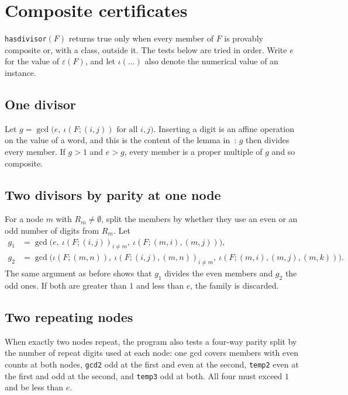 \documentclass[11pt]{article}
\theoremstyle{definition}
\theoremstyle{remark}
\newcommand{\code}[1]{\texttt{#1}}
\begin{document}
\section{Composite certificates}\label{sec:divisor}

\code{hasdivisor}$(F)$ returns true only when every member of $F$ is provably composite or, with a class, outside it. The tests below are tried in order. Write $e$ for the value of $\varepsilon(F)$, and let $\iota(\dots)$ also denote the numerical value of an instance.

\subsection{One divisor}
Let $g=\gcd\bigl(e,\ \iota(F;(i,j)) \text{ for all } i,j\bigr)$. Inserting a digit is an affine operation on the value of a word, and this is the content of the lemma in~\cite{BDS}: $g$ then divides every member. If $g>1$ and $e>g$, every member is a proper multiple of $g$ and so composite.

\subsection{Two divisors by parity at one node}
For a node $m$ with $R_m\ne\emptyset$, split the members by whether they use an even or an odd number of digits from $R_m$. Let
\begin{align*}
  g_1 &= \gcd\bigl(e,\ \iota(F;(i,j))_{i\ne m},\ \iota(F;(m,i),(m,j))\bigr),\\
  g_2 &= \gcd\bigl(\iota(F;(m,n)),\ \iota(F;(i,j),(m,n))_{i\ne m},\ \iota(F;(m,i),(m,j),(m,k))\bigr).
\end{align*}
The same argument as before shows that $g_1$ divides the even members and $g_2$ the odd ones. If both are greater than $1$ and less than $e$, the family is discarded.

\subsection{Two repeating nodes}
When exactly two nodes repeat, the program also tests a four-way parity split by the number of repeat digits used at each node: one gcd covers members with even counts at both nodes, \code{gcd2} odd at the first and even at the second, \code{temp2} even at the first and odd at the second, and \code{temp3} odd at both. All four must exceed $1$ and be less than $e$.
\end{document}
